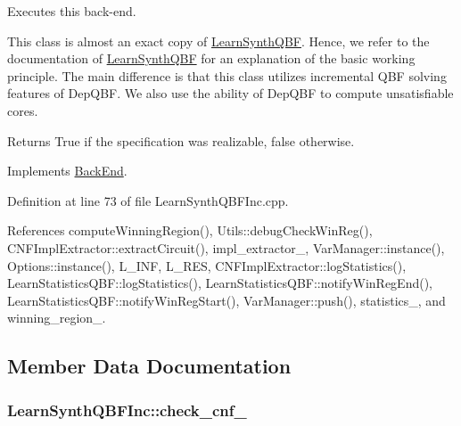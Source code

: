 Executes this back-\/end. 

This class is almost an exact copy of \hyperlink{classLearnSynthQBF}{Learn\-Synth\-Q\-B\-F}. Hence, we refer to the documentation of \hyperlink{classLearnSynthQBF}{Learn\-Synth\-Q\-B\-F} for an explanation of the basic working principle. The main difference is that this class utilizes incremental Q\-B\-F solving features of Dep\-Q\-B\-F. We also use the ability of Dep\-Q\-B\-F to compute unsatisfiable cores.

\begin{DoxyReturn}{Returns}
True if the specification was realizable, false otherwise. 
\end{DoxyReturn}


Implements \hyperlink{classBackEnd_a099e717dc71e9cc2d838b1ca86340590}{Back\-End}.



Definition at line 73 of file Learn\-Synth\-Q\-B\-F\-Inc.\-cpp.



References compute\-Winning\-Region(), Utils\-::debug\-Check\-Win\-Reg(), C\-N\-F\-Impl\-Extractor\-::extract\-Circuit(), impl\-\_\-extractor\-\_\-, Var\-Manager\-::instance(), Options\-::instance(), L\-\_\-\-I\-N\-F, L\-\_\-\-R\-E\-S, C\-N\-F\-Impl\-Extractor\-::log\-Statistics(), Learn\-Statistics\-Q\-B\-F\-::log\-Statistics(), Learn\-Statistics\-Q\-B\-F\-::notify\-Win\-Reg\-End(), Learn\-Statistics\-Q\-B\-F\-::notify\-Win\-Reg\-Start(), Var\-Manager\-::push(), statistics\-\_\-, and winning\-\_\-region\-\_\-.



\subsection{Member Data Documentation}
\hypertarget{classLearnSynthQBFInc_ac0ab1f2bc45740dc3e3e28e04a98d62d}{
\subsubsection[{check\-\_\-cnf\-\_\-}]{ Learn\-Synth\-Q\-B\-F\-Inc\-::check\-\_\-cnf\-\_\-\hspace{0.3cm}{\ttfamily [protected]}}}\label{classLearnSynthQBFInc_ac0ab1f2bc45740dc3e3e28e04a98d62d}



